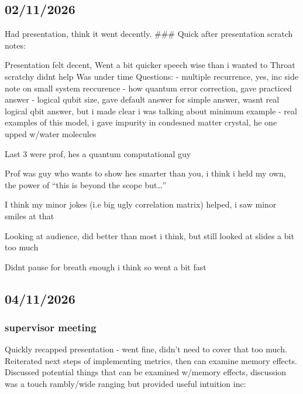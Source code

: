 \documentclass[
  letterpaper,
  DIV=11,
  numbers=noendperiod]{scrartcl}
\author{}
\date{}
\begin{document}
\subsection{02/11/2026}\label{section}

Had presentation, think it went decently. \#\#\# Quick after
presentation scratch notes:

Presentation felt decent, Went a bit quicker speech wise than i wanted
to Throat scratchy didnt help Was under time Questions: - multiple
recurrence, yes, inc side note on small system reccurence - how quantum
error correction, gave practiced answer - logical qubit size, gave
default answer for simple answer, wasnt real logical qbit answer, but i
made clear i was talking about minimum example - real examples of this
model, i gave impurity in condesned matter crystal, he one upped w/water
molecules

Last 3 were prof, hes a quantum computational guy

Prof was guy who wants to show hes smarter than you, i think i held my
own, the power of ``this is beyond the scope but\ldots{}''

I think my minor jokes (i.e big ugly correlation matrix) helped, i saw
minor smiles at that

Looking at audience, did better than most i think, but still looked at
slides a bit too much

Didnt pause for breath enough i think so went a bit fast

\subsection{04/11/2026}\label{section-1}

\subsubsection{supervisor meeting}\label{supervisor-meeting}

Quickly recapped presentation - went fine, didn't need to cover that too
much. Reiterated next steps of implementing metrics, then can examine
memory effects. Discussed potential things that can be examined w/memory
effects, discussion was a touch rambly/wide ranging but provided useful
intuition inc:
\end{document}
